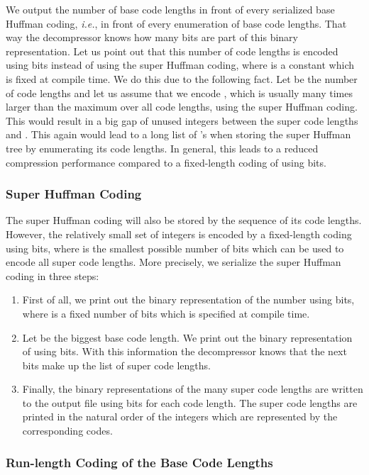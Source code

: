 \documentclass[12pt]{llncs}
\newcommand{\hairsp}{\hspace{1pt}}\newcommand{\TODO}{\textcolor{red}{\bf TODO!}\xspace}
\newcommand{\ie}{\mbox{\textit{i.\hairsp{}e.}}\xspace}
\begin{document}
We output the number of base code lengths in front of every serialized base Huffman coding, \ie, in front of every enumeration of base code lengths. That way the decompressor knows how many bits are part of this binary representation.
Let us point out that this number of code lengths is encoded using  bits instead of using the super Huffman coding, where  is a constant which is fixed at compile time. We do this due to the following fact. Let  be the number of code lengths and let us assume that we encode , which is usually many times larger than the maximum over all code lengths, using the super Huffman coding. This would result in a big gap of unused integers between the super code lengths and . This again would lead to a long list of 's when storing the super Huffman tree by enumerating its code lengths. In general, this leads to a reduced compression performance compared to a fixed-length coding of  using  bits.

\subsubsection{Super Huffman Coding}

The super Huffman coding will also be stored by the sequence of its code lengths. However, the relatively small set of integers is encoded by a fixed-length coding using  bits, where  is the smallest possible number of bits which can be used to encode all super code lengths. More precisely, we serialize the super Huffman coding in three steps:
\begin{enumerate}[(1)]
	\item First of all, we print out the binary representation of the number  using  bits, where  is a fixed number of bits which is specified at compile time.
	\item Let  be the biggest base code length. We print out the binary representation of  using  bits. With this information the decompressor knows that the next  bits make up the list of super code lengths.
	\item Finally, the binary representations of the  many super code lengths are written to the output file using  bits for each code length. The super code lengths are printed in the natural order of the integers which are represented by the corresponding codes.
\end{enumerate}

\subsubsection{Run-length Coding of the Base Code Lengths}\label{sec:run-lengthCoding}
\end{document}
